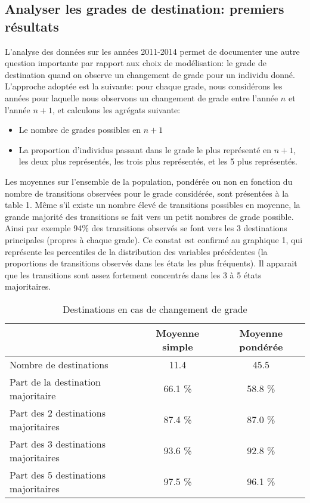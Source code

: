 \documentclass[11pt,a4paper]{article}
\begin{document}
\subsection{Analyser les grades de destination: premiers résultats}

L'analyse des données sur les années 2011-2014 permet de documenter une autre question importante par rapport aux choix de modélisation:
le grade de destination quand on observe un changement de grade pour un individu donné. L'approche adoptée est la suivante: pour chaque grade, 
nous considérons les années pour laquelle nous observons un changement de grade entre l'année $n$ et l'année $n+1$, et calculons les agrégats suivante: 


\begin{itemize}[leftmargin=1cm ,parsep=0cm,itemsep=0cm,topsep=0cm] 
\item Le nombre de grades possibles en $n+1$
\item La proportion d'individus passant dans le grade le plus représenté en $n+1$, les deux plus représentés, les trois plus représentés, et les 5 plus représentés. 
\end{itemize}

Les moyennes sur l'ensemble de la population, pondérée ou non en fonction du nombre de transitions observées pour le grade considérée, sont présentées à la table 1. Même s'il existe un nombre élevé de transitions possibles en moyenne, la grande majorité des transitions se fait vers un petit nombres de grade possible. Ainsi par exemple 94\% des transitions observés se font vers les 3 destinations principales (propres à chaque grade). Ce constat est confirmé au graphique 1, qui représente les percentiles de la distribution des variables précédentes (la proportions de transitions observés dans les états les plus fréquents). Il apparait que les transitions sont assez fortement concentrés dans les 3 à 5 états majoritaires. 

\begin{table}[h!]
\label{means}
\centering
\caption{Destinations en cas de changement de grade} 
\begin{tabular}{l|cc}
  \hline
 & Moyenne simple & Moyenne pondérée \\ 
  \hline
Nombre de destinations & 11.4 & 45.5 \\ 
  Part de la destination majoritaire   & 66.1 \% & 58.8 \%  \\ 
  Part des 2 destinations majoritaires & 87.4 \% & 87.0 \% \\ 
  Part des 3 destinations majoritaires & 93.6 \% & 92.8 \% \\ 
  Part des 5 destinations majoritaires & 97.5 \% & 96.1 \% \\ 
   \hline
\end{tabular}
\end{table}
\end{document}
